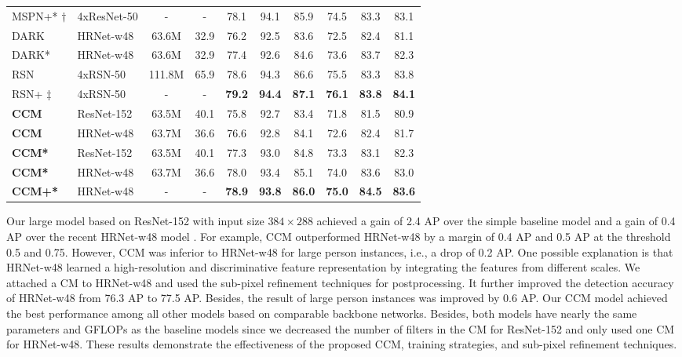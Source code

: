 \documentclass[twocolumn]{svjour3}          \smartqed  \usepackage{natbib}
\begin{document}
\begin{table*}[htbp]
\begin{tabular}{llcccccccc}
    MSPN+* \citep{li2019rethinking}$\dagger$ & 4xResNet-50 & - & - &78.1  &{94.1}       &{85.9}       &74.5       &{83.3}       &{83.1} \\
    DARK \citep{zhang2020distribution} & HRNet-w48 & 63.6M & 32.9 & 76.2     &  92.5     &  83.6     &  72.5     &  82.4    & 81.1 \\
    DARK* \citep{zhang2020distribution} & HRNet-w48 &  63.6M & 32.9 & 77.4 &  92.6     &  84.6     &  73.6     &  83.7    & 82.3 \\
    RSN \citep{cai2020learning} & 4xRSN-50 & 111.8M & 65.9 & 78.6  & 94.3      &86.6     &75.5     &83.3       &83.8 \\
    RSN+ \citep{cai2020learning}$\ddagger$ & 4xRSN-50 & - & - &\textbf{79.2}  &\textbf{94.4}       &\textbf{87.1}       &\textbf{76.1}       &\textbf{83.8}       &\textbf{84.1} \\
    \midrule
    \midrule
    \textbf{CCM} & ResNet-152 & 63.5M & 40.1 &  75.8   &  92.7     &  83.4     &  71.8     &  81.5   & 80.9 \\
    \textbf{CCM} & HRNet-w48 & 63.7M & 36.6 & 76.6    &  92.8     &  84.1     &  72.6     &  82.4    & 81.7 \\
    \textbf{CCM*} & ResNet-152 & 63.5M & 40.1 & 77.3    &  93.0     &  84.8     &  73.3     &  83.1   & 82.3 \\
    \textbf{CCM*}  & HRNet-w48 & 63.7M & 36.6 & 78.0   &  93.4     &  85.1     &  74.0    &  83.6    & 83.0 \\
    \textbf{CCM+*} & HRNet-w48& - & - & \textbf{78.9}    &  \textbf{93.8}     &  \textbf{86.0}     &  \textbf{75.0}     &  \textbf{84.5}    & \textbf{83.6} \\
    \bottomrule
    \end{tabular}\label{tab:SOTA_test}\end{table*}

Our large model based on ResNet-152 with input size $384\times288$ achieved a gain of 2.4 AP over the simple baseline model \citep{xiao2018simple} and a gain of 0.4 AP over the recent HRNet-w48 model \citep{sun2019deep}. For example, CCM outperformed HRNet-w48 by a margin of 0.4 AP and 0.5 AP at the threshold 0.5 and 0.75. However, CCM was inferior to HRNet-w48 for large person instances, i.e., a drop of 0.2 AP. One possible explanation is that HRNet-w48 learned a high-resolution and discriminative feature representation by integrating the features from different scales. We attached a CM to HRNet-w48 and used the sub-pixel refinement techniques for postprocessing. It further improved the detection accuracy of HRNet-w48 from 76.3 AP to 77.5 AP. Besides, the result of large person instances was improved by 0.6 AP. Our CCM model achieved the best performance among all other models based on comparable backbone networks. Besides, both models have nearly the same parameters and GFLOPs as the baseline models since we decreased the number of filters in the CM for ResNet-152 and only used one CM for HRNet-w48. These results demonstrate the effectiveness of the proposed CCM, training strategies, and sub-pixel refinement techniques. 
\end{document}
